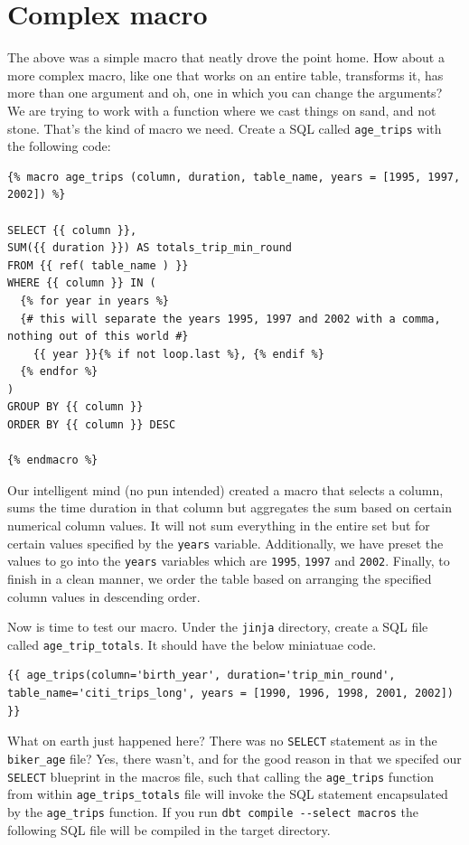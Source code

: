 \documentclass[
]{book}
\begin{document}
\hypertarget{complex-macro}{%
\section{Complex macro}\label{complex-macro}}

The above was a simple macro that neatly drove the point home. How about a more complex macro, like one that works on an entire table, transforms it, has more than one argument and oh, one in which you can change the arguments? We are trying to work with a function where we cast things on sand, and not stone. That's the kind of macro we need. Create a SQL called \texttt{age\_trips} with the following code:

\begin{verbatim}
{% macro age_trips (column, duration, table_name, years = [1995, 1997, 2002]) %}

SELECT {{ column }}, 
SUM({{ duration }}) AS totals_trip_min_round
FROM {{ ref( table_name ) }}
WHERE {{ column }} IN (
  {% for year in years %}
  {# this will separate the years 1995, 1997 and 2002 with a comma, nothing out of this world #}
    {{ year }}{% if not loop.last %}, {% endif %}
  {% endfor %}
)
GROUP BY {{ column }}
ORDER BY {{ column }} DESC

{% endmacro %}
\end{verbatim}

Our intelligent mind (no pun intended) created a macro that selects a column, sums the time duration in that column but aggregates the sum based on certain numerical column values. It will not sum everything in the entire set but for certain values specified by the \texttt{years} variable. Additionally, we have preset the values to go into the \texttt{years} variables which are \texttt{1995}, \texttt{1997} and \texttt{2002}. Finally, to finish in a clean manner, we order the table based on arranging the specified column values in descending order.

Now is time to test our macro. Under the \texttt{jinja} directory, create a SQL file called \texttt{age\_trip\_totals}. It should have the below miniatuae code.

\begin{verbatim}
{{ age_trips(column='birth_year', duration='trip_min_round',
table_name='citi_trips_long', years = [1990, 1996, 1998, 2001, 2002]) }}
\end{verbatim}

What on earth just happened here? There was no \texttt{SELECT} statement as in the \texttt{biker\_age} file? Yes, there wasn't, and for the good reason in that we specifed our \texttt{SELECT} blueprint in the macros file, such that calling the \texttt{age\_trips} function from within \texttt{age\_trips\_totals} file will invoke the SQL statement encapsulated by the \texttt{age\_trips} function. If you run \texttt{dbt\ compile\ -\/-select\ macros} the following SQL file will be compiled in the target directory.
\end{document}
